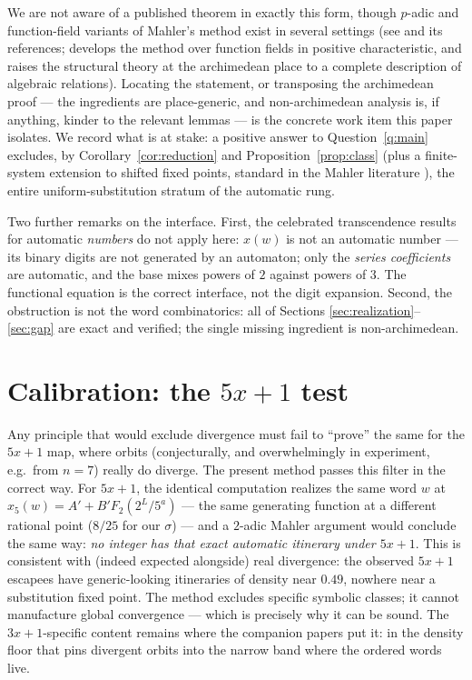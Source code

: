 \documentclass[11pt]{article}
\theoremstyle{definition}
\begin{document}
We are not aware of a published theorem in exactly this form, though
$p$-adic and function-field variants of Mahler's method exist in
several settings (see \cite{nishioka} and its references;
\cite{fernandes} develops the method over function fields in positive
characteristic, and \cite{af} raises the structural theory at the
archimedean place to a complete description of algebraic relations).
Locating the statement, or transposing the archimedean proof --- the
ingredients are place-generic, and non-archimedean analysis is, if
anything, kinder to the relevant lemmas --- is the concrete work item
this paper isolates. We record what is at stake: a positive answer to
Question~\ref{q:main} excludes, by Corollary~\ref{cor:reduction} and
Proposition~\ref{prop:class} (plus a finite-system extension to
shifted fixed points, standard in the Mahler literature \cite{af}),
the entire uniform-substitution stratum of the automatic rung.

Two further remarks on the interface. First, the celebrated
transcendence results for automatic \emph{numbers}
\cite{ab} do not apply here: $x(w)$ is not an automatic number ---
its binary digits are not generated by an automaton; only the
\emph{series coefficients} are automatic, and the base mixes powers
of $2$ against powers of $3$. The functional equation is the correct
interface, not the digit expansion. Second, the obstruction is not
the word combinatorics: all of Sections
\ref{sec:realization}--\ref{sec:gap} are exact and verified; the
single missing ingredient is non-archimedean.

\section{Calibration: the $5x+1$ test}\label{sec:calibration}

Any principle that would exclude divergence must fail to ``prove''
the same for the $5x+1$ map, where orbits (conjecturally, and
overwhelmingly in experiment, e.g.\ from $n = 7$) really do diverge.
The present method passes this filter in the correct way. For $5x+1$,
the identical computation realizes the same word $w$ at
$x_5(w) = A' + B' F_2(2^L/5^a)$ --- the same generating function at a
different rational point ($8/25$ for our $\sigma$) --- and a $2$-adic
Mahler argument would conclude the same way: \emph{no integer has
that exact automatic itinerary under $5x+1$}. This is consistent with
(indeed expected alongside) real divergence: the observed $5x+1$
escapees have generic-looking itineraries of density near $0.49$,
nowhere near a substitution fixed point. The method excludes specific
symbolic classes; it cannot manufacture global convergence --- which
is precisely why it can be sound. The $3x+1$-specific content remains
where the companion papers put it: in the density floor that pins
divergent orbits into the narrow band where the ordered words live.
\end{document}
